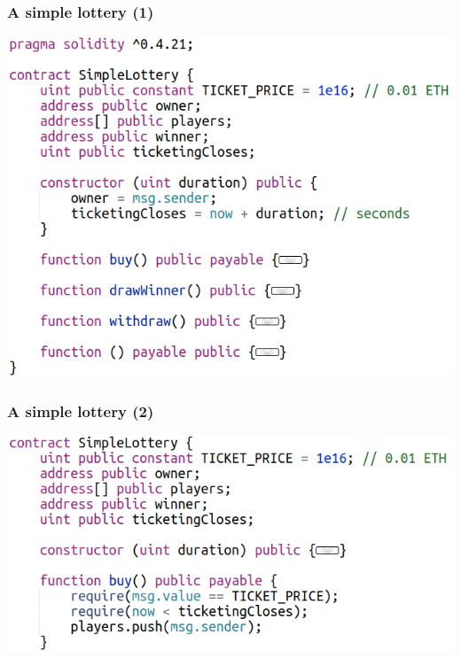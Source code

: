 \documentclass[11pt]{beamer}  %
\begin{document}
\begin{frame}\frametitle{A simple lottery (1)}

  \begin{center}
    \includegraphics[scale=0.4,clip=false]{pictures/simple-lottery-1.png}
  \end{center}

\end{frame}

\begin{frame}\frametitle{A simple lottery (2)}

  \begin{center}
    \includegraphics[scale=0.45,clip=false]{pictures/simple-lottery-2.png}
  \end{center}

\end{frame}
\end{document}

